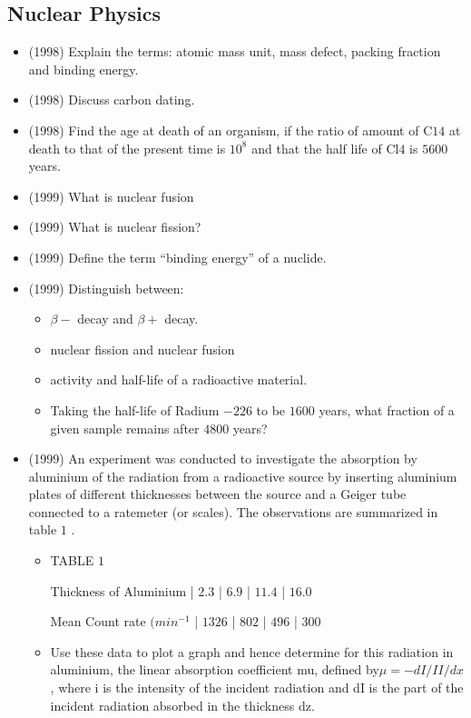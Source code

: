 \documentclass{article}
\begin{document}
\subsection{Nuclear Physics}
\begin{itemize}
\item (1998)  Explain the terms: atomic mass unit, mass defect, packing fraction and binding energy.
\item (1998)  Discuss carbon dating.
\item (1998)  Find the age at death of an organism, if the ratio of amount of C$ 14$ at death to that of the present time is $ 10^{8}$ and that the half life of Cl$ 4$ is $ 5600$ years.
\item (1999)  What is nuclear fusion 
\item (1999)  What is nuclear fission?
\item (1999)  Define the term “binding energy” of a nuclide.
\item (1999)  Distinguish between:\begin{itemize}
\item $ \beta -$ decay and $ \beta +$ decay.
\item nuclear fission and nuclear fusion
\item activity and half-life of a radioactive material.
\item Taking the half-life of Radium $ -226$ to be $ 1600$ years, what fraction of a given sample remains after $ 4800$ years?
\end{itemize}
\item (1999)  An experiment was conducted to investigate the absorption by aluminium of the radiation from a radioactive source by inserting aluminium plates of different thicknesses between the source and a Geiger tube connected to a ratemeter (or scales). The observations are summarized in table $ 1$ .\begin{itemize}
\item TABLE $ 1$
\item [Thickness of Aluminium | $ 2.3$ | $ 6.9$ | $ 11.4$ | $ 16.0$ ]
\item [Mean Count rate $ (min^{-1}$ | $ 1326$ | $ 802$ | $ 496$ | $ 300$ ]
\item Use these data to plot a graph and hence determine for this radiation in aluminium, the linear absorption coefficient mu, defined by$ \mu = - dI/I  I/dx$ , where i is the intensity of the incident radiation and dI is the part of the incident radiation absorbed in the thickness dz.
\end{itemize}

\end{itemize}
\end{document}
